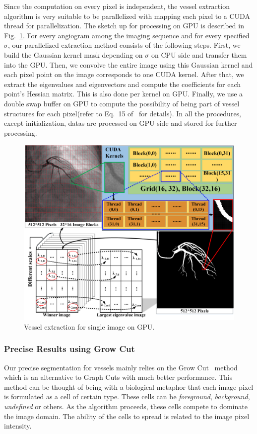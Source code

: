 \documentclass[journal]{IEEEtran}
\begin{document}
Since the computation on every pixel is independent, the vessel extraction algorithm is very suitable to be parallelized with mapping each pixel to a CUDA thread for parallelization. The sketch up for processing on GPU is described in Fig.~\ref{fig:hessian_gpu}. For every angiogram among the imaging sequence and for every specified $\sigma$, our parallelized extraction method consists of the following steps. First, we build the Gaussian kernel mask depending on $\sigma$ on CPU side and transfer them into the GPU. Then, we convolve the entire image using this Gaussian kernel and each pixel point on the image corresponds to one CUDA kernel. After that, we extract the eigenvalues and eigenvectors and compute the coefficients for each point's Hessian matrix. This is also done per kernel on GPU. Finally, we use a double swap buffer on GPU to compute the possibility of being part of vessel structures for each pixel(refer to Eq.~15 of~\cite{Frangi} for details). In all the procedures, except initialization, datas are processed on GPU side and stored for further processing.

\begin{figure}[!t]
\centering
\includegraphics[width=1.0\linewidth]{./images/hessian_gpu.png}
\caption{Vessel extraction for single image on GPU.}
\label{fig:hessian_gpu}
\end{figure}

\subsubsection{\textbf{Precise Results using Grow Cut}}
\label{subsubsec:growcut}
Our precise segmentation for vessels mainly relies on the Grow Cut~\cite{vezhnevets2005growcut} method which is an alternative to Graph Cuts with much better performance. This method can be thought of being with a biological metaphor that each image pixel is formulated as a cell of certain type. These cells can be \textit{foreground}, \textit{background}, \textit{undefined} or others. As the algorithm proceeds, these cells compete to dominate the image domain. The ability of the cells to spread is related to the image pixel intensity.
\end{document}
